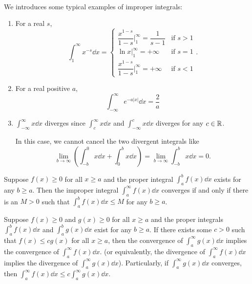     \begin{exampleenv}
        We introduces some typical examples of improper integrals:
        \begin{enumerate}[label=(\arabic*)]
            \item For a real $s$,
            \[
            \int_1^\infty x^{-s} \dd x = \begin{cases}
            \dfrac{x^{1-s}}{1-s} \Big|_1^\infty = \dfrac{1}{s-1} & \text{if } s>1\\[6pt]
            \ln x \Big|_1^\infty = +\infty & \text{if } s=1\\[6pt]
            \dfrac{x^{1-s}}{1-s} \Big|_1^\infty = +\infty & \text{if } s<1
            \end{cases}.
            \]
            \item For a real positive $a$,
            \[
            \int_{-\infty}^\infty e^{-a|x|} \dd x = \frac{2}{a}
            \]
            \item $\displaystyle \int_{-\infty}^\infty x \dd x$ diverges since $\displaystyle \int_c^\infty x \dd x$ and $\displaystyle \int_{-\infty}^c x \dd x$ diverges for any $c\in \mathbb{R}$.
            
            In this case, we cannot cancel the two divergent integrals like
            \[
            \lim_{b\to \infty} (\int_{-b}^0 x \dd x + \int_0^b x \dd x) = \lim_{b\to \infty} \int_{-b}^b x \dd x = 0.
            \]
            
            \end{enumerate}
    \end{exampleenv}
    \begin{theoremenv}
        Suppose $f(x)\ge 0$ for all $x\ge a$ and the proper integral $\displaystyle \int_a^b f(x) \dd x$ exists for any $b\ge a$. Then the improper integral $\displaystyle \int_a^\infty f(x) \dd x$ converges if and only if there is an $M>0$ such that $\displaystyle \int_a^b f(x) \dd x \le M$ for any $b\ge a$.
    \end{theoremenv}
    \begin{theoremenv}
        Suppose $f(x)\ge 0$ and $g(x)\ge 0$ for all $x\ge a$ and the proper integrals $\displaystyle \int_a^b f(x) \dd x$ and $\displaystyle \int_a^b g(x) \dd x$ exist for any $b\ge a$. If there exists some $c>0$ such that $f(x) \le c g(x)$ for all $x\ge a$, then the convergence of $\displaystyle \int_a^\infty g(x) \dd x$ implies the convergence of $\displaystyle \int_a^\infty f(x) \dd x$. (or equivalently, the divergence of $\displaystyle \int_a^\infty f(x) \dd x$ implies the divergence of $\displaystyle \int_a^\infty g(x) \dd x$). Particularly, if $\displaystyle \int_a^\infty g(x) \dd x$ converges, then $\displaystyle \int_a^\infty f(x) \dd x \le c \int_a^\infty g(x) \dd x$.
    \end{theoremenv}
